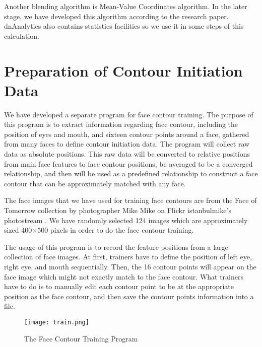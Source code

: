 Another blending algorithm is Mean-Value Coordinates algorithm. In the later stage, we have developed this algorithm according to the research paper. dnAnalytics also contains statistics facilities so we use it in some steps of this calculation.

\section{Preparation of Contour Initiation Data}

\hspace{0.5in}We have developed a separate program for face contour training. The purpose of this program is to extract information regarding face contour, including the position of eyes and mouth, and sixteen contour points around a face, gathered from many faces to define contour initiation data. The program will collect raw data as absolute positions. This raw data will be converted to relative positions from main face features to face contour positions, be averaged to be a converged relationship, and then will be used as a predefined relationship to construct a face contour that can be approximately matched with any face.

The face images that we have used for training face contours are from the Face of Tomorrow collection by photographer Mike Mike on Flickr istanbulmike's photostream \cite{website:faceimages}. We have randomly selected 124 images which are approximately sized 400${\times}$500 pixels in order to do the face contour training.

The usage of this program is to record the feature positions from a large collection of face images. At first, trainers have to define the position of left eye, right eye, and mouth sequentially. Then, the 16 contour points will appear on the face image which might not exactly match to the face contour. What trainers have to do is to manually edit each contour point to be at the appropriate position as the face contour, and then save the contour points information into a file.

\begin{figure}[htb]
   \centering
   \texttt{[image: train.png]}
   \caption{The Face Contour Training Program}
   \label{fig:InterfaceTrain}
\end{figure} 